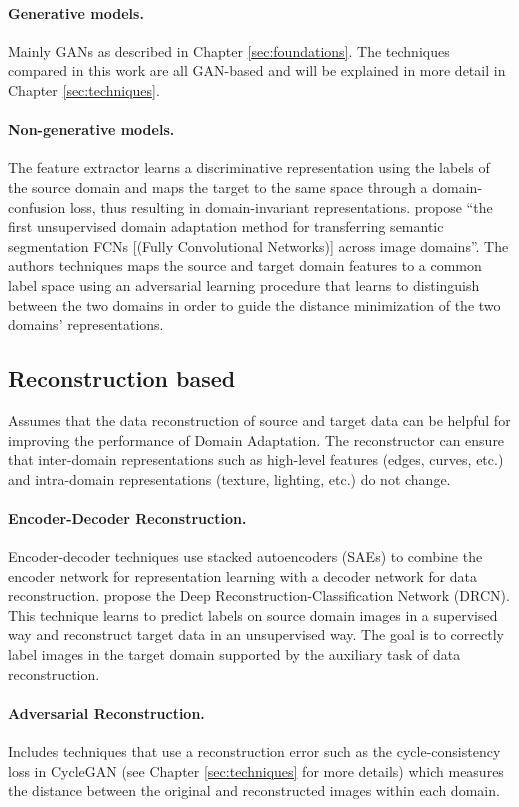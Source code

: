 \paragraph{Generative models.}
Mainly GANs as described in Chapter \ref{sec:foundations}. The techniques compared in this work are all GAN-based and will be explained in more detail in Chapter \ref{sec:techniques}.

\paragraph{Non-generative models.}
The feature extractor learns a discriminative representation using the labels of the source domain and maps the target to the same space through a domain-confusion loss, thus resulting in domain-invariant representations. \cite{DBLP:journals/corr/HoffmanWYD16} propose ``the first unsupervised domain adaptation method for transferring semantic segmentation FCNs [(Fully Convolutional Networks)] across image domains''. The authors techniques maps the source and target domain features to a common label space using an adversarial learning procedure that learns to distinguish between the two domains in order to guide the distance minimization of the two domains' representations. 

\subsection{Reconstruction based}
Assumes that the data reconstruction of source and target data can be helpful for improving the performance of Domain Adaptation. The reconstructor can ensure that inter-domain representations such as high-level features (edges, curves, etc.) and intra-domain representations (texture, lighting, etc.) do not change.

\paragraph{Encoder-Decoder Reconstruction.}
Encoder-decoder techniques use stacked autoencoders (SAEs) to combine the encoder network for representation learning with a decoder network for data reconstruction. \cite{DBLP:journals/corr/GhifaryKZBL16} propose the Deep Reconstruction-Classification Network (DRCN). This technique learns to predict labels on source domain images in a supervised way and reconstruct target data in an unsupervised way. The goal is to correctly label images in the target domain supported by the auxiliary task of data reconstruction. 

\paragraph{Adversarial Reconstruction.}
Includes techniques that use a reconstruction error such as the cycle-consistency loss in CycleGAN (see Chapter \ref{sec:techniques} for more details) which measures the distance between the original and reconstructed images within each domain.
